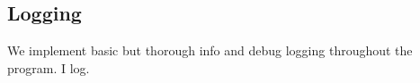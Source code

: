 \subsection{Logging}
We implement basic but thorough info and debug logging throughout the
program. 
I log.

